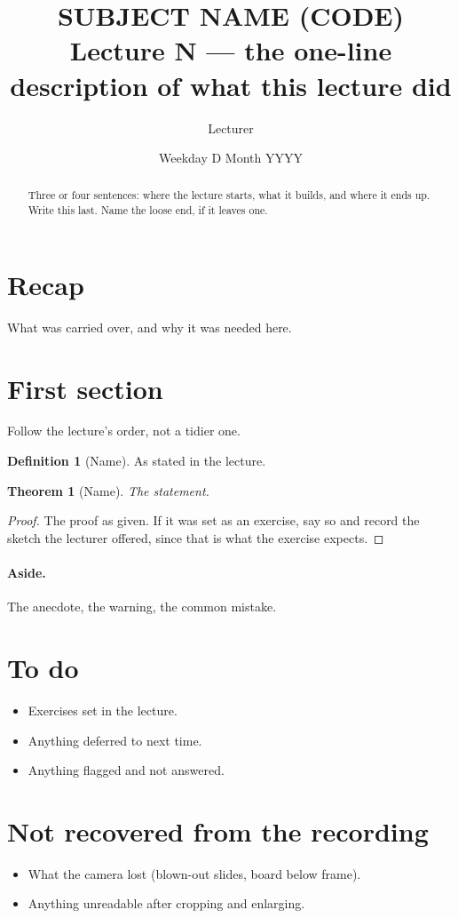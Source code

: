 \documentclass[11pt]{article}
\title{SUBJECT NAME (CODE)\\[2pt]
       \large Lecture N --- the one-line description of what this lecture did}
\author{Lecturer}
\date{Weekday D Month YYYY}
\theoremstyle{definition}
\newtheorem{definition}{Definition}
\theoremstyle{plain}
\newtheorem{theorem}{Theorem}
\theoremstyle{remark}
\begin{document}
\maketitle

\begin{abstract}
\noindent Three or four sentences: where the lecture starts, what it builds, and
where it ends up. Write this last. Name the loose end, if it leaves one.
\end{abstract}

\section{Recap}

What was carried over, and why it was needed here.

\section{First section}

Follow the lecture's order, not a tidier one.

\begin{definition}[Name]
As stated in the lecture.
\end{definition}

\begin{theorem}[Name]
The statement.
\end{theorem}

\begin{proof}
The proof as given. If it was set as an exercise, say so and record the sketch
the lecturer offered, since that is what the exercise expects.
\end{proof}

\paragraph{Aside.}
The anecdote, the warning, the common mistake.

\section*{To do}

\begin{itemize}[nosep]
  \item Exercises set in the lecture.
  \item Anything deferred to next time.
  \item Anything flagged and not answered.
\end{itemize}

\section*{Not recovered from the recording}

\begin{itemize}[nosep]
  \item What the camera lost (blown-out slides, board below frame).
  \item Anything unreadable after cropping and enlarging.
\end{itemize}
\end{document}
